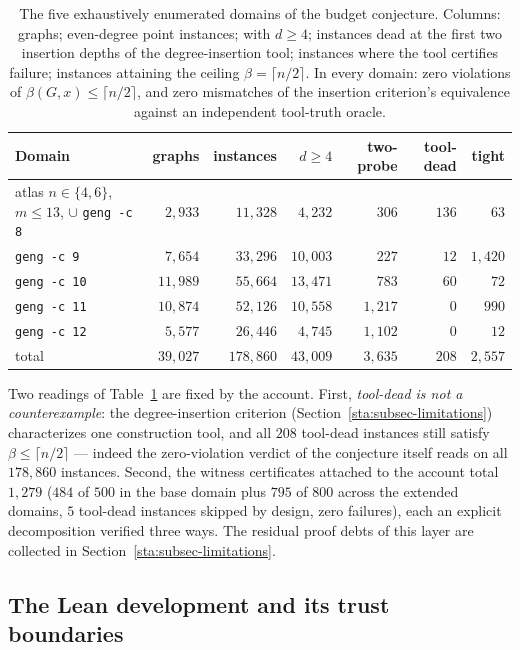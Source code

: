 \begin{table}[ht]
\centering\small
\caption{The five exhaustively enumerated domains of the budget conjecture.
Columns: graphs; even-degree point instances; with $d\ge4$; instances dead
at the first two insertion depths of the degree-insertion tool; instances
where the tool certifies failure; instances attaining the ceiling
$\beta=\lceil n/2\rceil$. In every domain: zero violations of
$\beta(G,x)\le\lceil n/2\rceil$, and zero mismatches of the insertion
criterion's equivalence against an independent tool-truth oracle.}
\label{com:tab-kdomains}
\begin{tabular}{lrrrrrr}
\hline
Domain & graphs & instances & $d\ge4$ & two-probe & tool-dead & tight\\
\hline
atlas $n\in\{4,6\}$, $m\le13$, $\cup$ \texttt{geng -c 8} & $2{,}933$ &
$11{,}328$ & $4{,}232$ & $306$ & $136$ & $63$\\
\texttt{geng -c 9} & $7{,}654$ & $33{,}296$ & $10{,}003$ & $227$ & $12$ &
$1{,}420$\\
\texttt{geng -c 10} & $11{,}989$ & $55{,}664$ & $13{,}471$ & $783$ & $60$ &
$72$\\
\texttt{geng -c 11} & $10{,}874$ & $52{,}126$ & $10{,}558$ & $1{,}217$ &
$0$ & $990$\\
\texttt{geng -c 12} & $5{,}577$ & $26{,}446$ & $4{,}745$ & $1{,}102$ & $0$ &
$12$\\
\hline
total & $39{,}027$ & $178{,}860$ & $43{,}009$ & $3{,}635$ & $208$ &
$2{,}557$\\
\hline
\end{tabular}
\end{table}

Two readings of Table~\ref{com:tab-kdomains} are fixed by the account.
First, \emph{tool-dead is not a counterexample}: the degree-insertion
criterion (Section~\ref{sta:subsec-limitations}) characterizes one
construction tool, and all $208$ tool-dead instances still satisfy
$\beta\le\lceil n/2\rceil$ --- indeed the zero-violation verdict of the
conjecture itself reads on all $178{,}860$ instances. Second, the witness
certificates attached to the account total $1{,}279$ ($484$ of $500$ in the
base domain plus $795$ of $800$ across the extended domains, $5$
tool-dead instances skipped by design, zero failures), each an explicit
decomposition verified three ways. The residual proof debts of this layer
are collected in Section~\ref{sta:subsec-limitations}.

\subsection{The Lean development and its trust boundaries}\label{com:subsec-lean}

